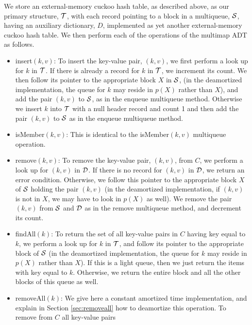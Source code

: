 \documentclass[11pt,letterpaper]{article}
\newcommand{\eat}[1]{}
\begin{document}
We store an external-memory cuckoo hash table, as
described above, as our primary structure, $\cal T$,
with each record pointing to a block
in a multiqueue, $\cal S$, having an auxiliary dictionary, $D$,
implemented as yet another external-memory cuckoo hash table.
We then perform each
of the operations of the multimap ADT as follows.

\begin{itemize}
\item
insert$(k,v)$: To insert the key-value pair, $(k,v)$,
we first perform a look up for $k$ in $\cal T$.
If there is already a record for $k$ in $\cal T$, we increment its count. We
 then follow its pointer to the appropriate block $X$ in $\cal S$, (in the deamortized implementation,
the queue for $k$ may reside in $p(X)$ rather than $X$),
and add the pair $(k,v)$ to $\cal S$, as in the enqueue multiqueue method.
Otherwise we insert $k$ into $\cal T$ with a null header record and count 1 and then add the pair $(k, v)$ 
to $\cal S$ as in the enqueue multiqueue method.
\item
isMember$(k,v)$: This is identical to the isMember$(k,v)$ multiqueue operation. \eat{We do a look up in $D$ to determine whether the key-value pair
$(k,v)$ exists as a record in $\cal S$, and return 
a Boolean value encoding the success or failure of this
look up.} 
\item
remove$(k,v)$: To remove the key-value pair, $(k,v)$, from $C$,
we perform a look up for $(k,v)$ in $\cal D$. If there is no record for $(k,v)$ in $\cal D$, we
return an error condition. Otherwise, we follow this pointer
to the appropriate block $X$ of $\cal S$ holding the pair $(k,v)$ (in the deamortized implementation,
if $(k,v)$ is not in $X$, we may have to look in $p(X)$ as well).
We remove the pair $(k,v)$ from $\cal S$ and $\cal D$ as in the remove multiqueue method, and decrement its count.
\item
findAll$(k)$: To return the set of all key-value pairs
in $C$ having key equal to $k$, we perform a look up for $k$ in $\cal T$,
and follow its pointer to the appropriate block of $\cal S$ (in the deamortized implementation,
the queue for $k$ may reside in $p(X)$ rather than $X$). If this
is a light queue, then we just return the items with key equal to
$k$.
Otherwise, we return the entire block and all the other blocks of
this queue as well.
\item
removeAll$(k)$: We give here a constant amortized time implementation, and explain
in Section \ref{sec:removeall} how to deamortize this operation. To remove from $C$ all key-value pairs

\end{itemize}
\end{document}

